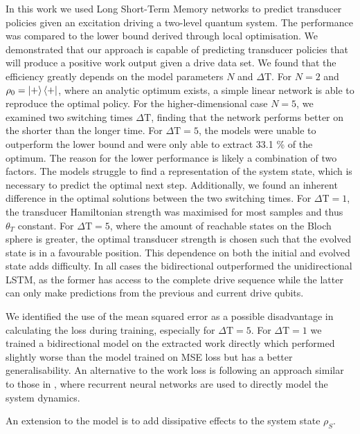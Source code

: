 In this work we used Long Short-Term Memory networks to predict transducer policies given an excitation driving a two-level quantum system.
The performance was compared to the lower bound derived through local optimisation.
We demonstrated that our approach is capable of predicting transducer policies that will produce a positive work output given a drive data set.
We found that the efficiency greatly depends on the model parameters $N$ and $\Delta \mathrm{T}$.
For $N=2$ and $\rho_0 = \ket{+}\bra{+}$, where an analytic optimum exists, a simple linear network is able to reproduce the optimal policy.
For the higher-dimensional case $N=5$, we examined two switching times $\Delta \mathrm{T}$, finding that the network performs better on the shorter than the longer time.
For $\Delta \mathrm{T} = 5$, the models were unable to outperform the lower bound and were only able to extract 33.1 \% of the optimum.
The reason for the lower performance is likely a combination of two factors.
The models struggle to find a representation of the system state, which is necessary to predict the optimal next step.
Additionally, we found an inherent difference in the optimal solutions between the two switching times. For $\Delta \mathrm{T} = 1$, the transducer Hamiltonian strength was maximised for most samples and thus $\theta_T$ constant.
For $\Delta \mathrm{T} = 5$, where the amount of reachable states on the Bloch sphere is greater, the optimal transducer strength is chosen such that the evolved state is in a favourable position.
This dependence on both the initial and evolved state adds difficulty.
In all cases the bidirectional outperformed the unidirectional LSTM, as the former has access to the complete drive sequence while the latter can only make predictions from the previous and current drive qubits.

We identified the use of the mean squared error as a possible disadvantage in calculating the loss during training, especially for $\Delta \mathrm{T} = 5$.
For $\Delta \mathrm{T} = 1$ we trained a bidirectional model on the extracted work directly which performed slightly worse than the model trained on MSE loss but has a better generalisability.
An alternative to the work loss is following an approach similar to those in \cite{Banchi_2018, PhysRevX.10.011006}, where recurrent neural networks are used to directly model the system dynamics.

An extension to the model is to add dissipative effects to the system state $\rho_S$.

